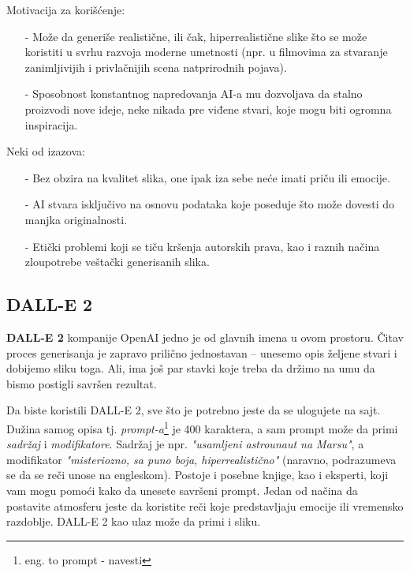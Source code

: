 \documentclass[12pt, letterpaper]{article}
\begin{document}
Motivacija za korišćenje:
\begin{itemize}
  \item[-] Može da generiše realistične, ili čak, hiperrealistične slike što se može koristiti u svrhu razvoja moderne umetnosti (npr. u filmovima za stvaranje zanimljivijih i privlačnijih scena natprirodnih pojava).
  \item[-] Sposobnost konstantnog napredovanja AI-a mu dozvoljava da stalno proizvodi nove ideje, neke nikada pre viđene stvari, koje mogu biti ogromna inspiracija.
\end{itemize}

Neki od izazova:
\begin{itemize}
    \item[-] Bez obzira na kvalitet slika, one ipak iza sebe neće imati priču ili emocije.
    \item[-] AI stvara isključivo na osnovu podataka koje poseduje što može dovesti do manjka originalnosti.
    \item[-] Etički problemi koji se tiču kršenja autorskih prava, kao i raznih načina zloupotrebe veštački generisanih slika. 
\end{itemize}

\subsection{DALL-E 2}
\textbf{DALL-E 2} kompanije OpenAI jedno je od glavnih imena u ovom prostoru. Čitav proces generisanja je zapravo prilično jednostavan – unesemo opis željene stvari i dobijemo sliku toga. Ali, ima još par stavki koje treba da držimo na umu da bismo postigli savršen rezultat.

Da biste koristili DALL-E 2, sve što je potrebno jeste da se ulogujete na sajt. Dužina samog opisa tj. \textit{prompt-a}\footnote{eng. to prompt - navesti} je 400 karaktera, a sam prompt može da primi \textit{sadržaj} i \textit{modifikatore}. Sadržaj je npr. \textit{"usamljeni astrounaut na Marsu"}, a modifikator \textit{"misteriozno, sa puno boja, hiperrealistično"} (naravno, podrazumeva se da se reči unose na engleskom). Postoje i posebne knjige\cite{Prompt}, kao i eksperti, koji vam mogu pomoći kako da unesete savršeni prompt. Jedan od načina da postavite atmosferu jeste da koristite reči koje predstavljaju emocije ili vremensko razdoblje. DALL-E 2 kao ulaz može da primi i sliku.
\end{document}
